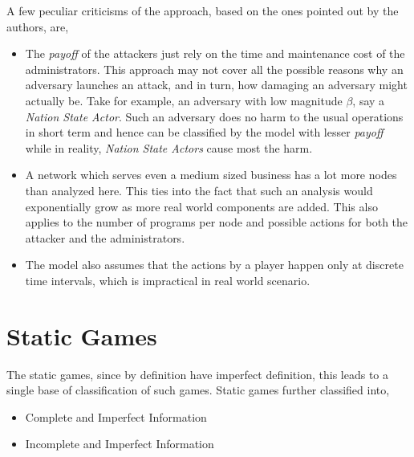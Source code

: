 \documentclass[conference]{IEEEtran}
\begin{document}
A few peculiar criticisms of the approach, based on the ones pointed out by the authors, are,
\begin{itemize}
	\item The \textit{payoff} of the attackers just rely on the time and maintenance cost of the administrators.
		This approach may not cover all the possible reasons why an adversary launches an attack, and in turn, how damaging an adversary might actually be.
		Take for example, an adversary with low magnitude $\beta$, say a \textit{Nation State Actor}.
		Such an adversary does no harm to the usual operations in short term and hence can be classified by the model with lesser \textit{payoff} while in reality, \textit{Nation State Actors} cause most the harm.
	\item A network which serves even a medium sized business has a lot more nodes than analyzed here.
		This ties into the fact that such an analysis would exponentially grow as more real world components are added.
		This also applies to the number of programs per node and possible actions for both the attacker and the administrators.
	\item The model also assumes that the actions by a player happen only at discrete time intervals, which is impractical in real world scenario.
\end{itemize}

\section*{Static Games}
The static games, since by definition have imperfect definition, this leads to a single base of classification of such games.
Static games further classified into,
\begin{itemize}
    \item Complete and Imperfect Information
    \item Incomplete and Imperfect Information
\end{itemize}

\printbibliography
\end{document}
